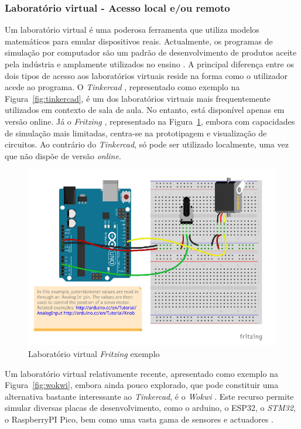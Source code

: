 \subsubsection{Laboratório virtual - Acesso local e/ou remoto}
Um laboratório virtual é uma poderosa ferramenta que utiliza modelos matemáticos para emular dispositivos reais. Actualmente, os programas de simulação por computador são um padrão de desenvolvimento de produtos aceite pela indústria e amplamente utilizados no ensino \cite{HERADIO20161, POTKONJAK2016309}. A principal diferença entre os dois tipos de acesso aos laboratórios virtuais reside na forma como o utilizador acede ao programa. O \textit{Tinkercad} \cite{tinkercad}, representado como exemplo na Figura~\ref{fig:tinkercad}, é um dos laboratórios virtuais mais frequentemente utilizados em contexto de sala de aula. No entanto, está disponível apenas em versão online. Já o \textit{Fritzing} \cite{fritzingdown}, representado na Figura~\ref{fig:fritzing}, embora com capacidades de simulação mais limitadas, centra-se na prototipagem e visualização de circuitos. Ao contrário do \textit{Tinkercad}, só pode ser utilizado localmente, uma vez que não dispõe de versão \textit{online}.

\begin{figure}[hbtp]
    \centering
    \includegraphics[width=0.6\linewidth]{figures/fritzing.png}
    \caption{Laboratório virtual \textit{Fritzing} exemplo}
    \label{fig:fritzing}
\end{figure}

Um laboratório virtual relativamente recente, apresentado como exemplo na Figura~\ref{fig:wokwi}, embora ainda pouco explorado, que pode constituir uma alternativa bastante interessante ao \textit{Tinkercad}, é o \textit{Wokwi} \cite{wokwi}. Este recurso permite simular diversas placas de desenvolvimento, como o \gls{arduino}, o \gls{ESP32}, o \textit{STM32}, o \gls{RaspberryPI} Pico, bem como uma vasta gama de sensores e actuadores \cite{wokwi}.

